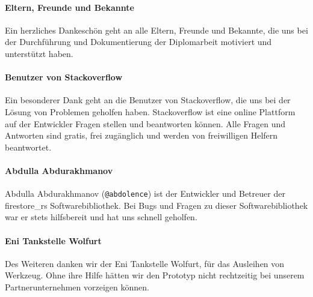 \paragraph*{Eltern, Freunde und Bekannte}
Ein herzliches Dankeschön geht an alle Eltern, Freunde und Bekannte, die uns bei der Durchführung und Dokumentierung der Diplomarbeit motiviert und unterstützt haben.

\paragraph*{Benutzer von Stackoverflow}
Ein besonderer Dank geht an die Benutzer von Stackoverflow, die uns bei der Lösung von Problemen geholfen haben. Stackoverflow ist eine online Plattform auf der Entwickler Fragen stellen und beantworten können. Alle Fragen und Antworten sind gratis, frei zugänglich und werden von freiwilligen Helfern beantwortet.

\paragraph*{Abdulla Abdurakhmanov }
Abdulla Abdurakhmanov (\texttt{@abdolence}) ist der Entwickler und Betreuer der firestore\_rs Softwarebibliothek. Bei Bugs und Fragen zu dieser Softwarebibliothek war er stets hilfsbereit und hat uns schnell geholfen.

\paragraph*{Eni Tankstelle Wolfurt}
Des Weiteren danken wir der Eni Tankstelle Wolfurt, für das Ausleihen von Werkzeug. Ohne ihre Hilfe hätten wir den Prototyp nicht rechtzeitig bei unserem Partnerunternehmen vorzeigen können.
